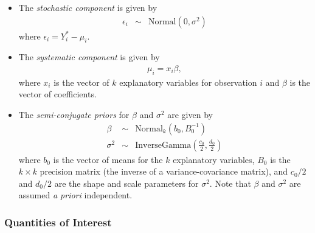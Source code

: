 \begin{itemize}
\item The \emph{stochastic component} is given by 
\begin{eqnarray*} 
\epsilon_{i}  &  \sim & \textrm{Normal}(0, \sigma^2)
\end{eqnarray*} 
where $\epsilon_{i}=Y^*_i-\mu_i$. 

\item The \emph{systematic component} is given by
\begin{eqnarray*}
\mu_{i}= x_{i} \beta,
\end{eqnarray*}
where $x_{i}$ is the vector of $k$ explanatory variables for
observation $i$ and $\beta$ is the vector of coefficients.

\item The \emph{semi-conjugate priors} for $\beta$ and $\sigma^2$ are
given by 
\begin{eqnarray*} 
\beta & \sim & \textrm{Normal}_k \left( b_{0},B_{0}^{-1}\right) \\
\sigma^{2} & \sim & \textrm{InverseGamma} \left( \frac{c_0}{2}, \frac{d_0}{2}
\right) 
\end{eqnarray*}
where $b_{0}$ is the vector of means for the $k$ explanatory
variables, $B_{0}$ is the $k\times k$ precision matrix (the inverse of
a variance-covariance matrix), and $c_0/2$ and $d_0/2$ are the shape
and scale parameters for $\sigma^{2}$.  Note that $\beta$ and
$\sigma^2$ are assumed \emph{a priori} independent.
\end{itemize}

\subsubsection{Quantities of Interest}

